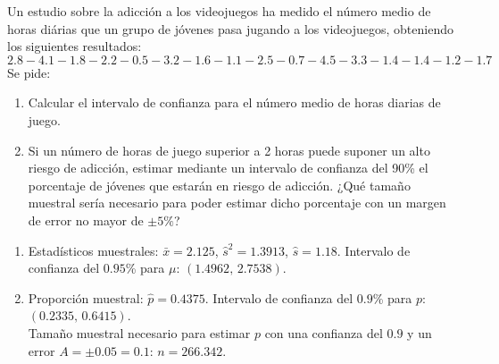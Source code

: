 {Un estudio sobre la adicción a los videojuegos ha medido el número medio de horas diárias que un grupo de jóvenes pasa
jugando a los videojuegos, obteniendo los siguientes resultados:
\[
2.8 - 4.1 - 1.8 - 2.2 - 0.5 - 3.2 - 1.6 - 1.1 - 2.5 - 0.7 - 4.5 - 3.3 - 1.4 - 1.4 - 1.2 - 1.7 
\] 
Se pide:
\begin{enumerate}
\item Calcular el intervalo de confianza para el número medio de horas diarias de juego.
\item Si un número de horas de juego superior a 2 horas puede suponer un alto riesgo de adicción, estimar mediante un intervalo de confianza
del 90\% el porcentaje de jóvenes que estarán en riesgo de adicción. ¿Qué tamaño muestral sería necesario para poder estimar dicho
porcentaje con un margen de error no mayor de $\pm 5\%$?
\end{enumerate}
}
{\begin{enumerate}
\item Estadísticos muestrales: $\bar x=2.125$, $\hat s^2 = 1.3913$, $\hat s = 1.18$. Intervalo de confianza del $0.95$\% para $\mu$:
$(1.4962,\,2.7538)$.

\item Proporción muestral: $\hat p = 0.4375$. Intervalo de confianza del $0.9$\% para $p$: $(0.2335,\,0.6415)$.\\
Tamaño muestral necesario para estimar $p$ con una confianza del $0.9$ y un error $A=\pm 0.05 = 0.1$: $n=266.342$. 
\end{enumerate}
}
{
}
